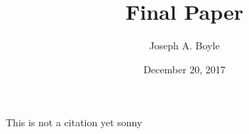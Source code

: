 \documentclass{article}
\title{Final Paper}
\author{Joseph A. Boyle}
\date{December 20, 2017}
\begin{document}
\maketitle



\newpage

\begin{thebibliography}{6}

This is not a citation yet sonny 

\end{thebibliography}
\end{document}
